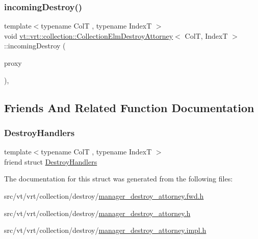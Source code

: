 \subsubsection{\texorpdfstring{incoming\+Destroy()}{incomingDestroy()}}
{\footnotesize\ttfamily template$<$typename ColT , typename IndexT $>$ \\
void \hyperlink{structvt_1_1vrt_1_1collection_1_1_collection_elm_destroy_attorney}{vt\+::vrt\+::collection\+::\+Collection\+Elm\+Destroy\+Attorney}$<$ ColT, IndexT $>$\+::incoming\+Destroy (\begin{DoxyParamCaption}\item[{\hyperlink{namespacevt_a2be17f5dafb626fe9f58d762b6aad2f0}{Collection\+Index\+Proxy}$<$ ColT, IndexT $>$ const \&}]{proxy }\end{DoxyParamCaption})\hspace{0.3cm}{\ttfamily [static]}, {\ttfamily [private]}}



\subsection{Friends And Related Function Documentation}
\mbox{\label{structvt_1_1vrt_1_1collection_1_1_collection_elm_destroy_attorney_ab072692eaf0bed072206c6c8119b79ea}} 
\subsubsection{\texorpdfstring{Destroy\+Handlers}{DestroyHandlers}}
{\footnotesize\ttfamily template$<$typename ColT , typename IndexT $>$ \\
friend struct \hyperlink{structvt_1_1vrt_1_1collection_1_1_destroy_handlers}{Destroy\+Handlers}\hspace{0.3cm}{\ttfamily [friend]}}



The documentation for this struct was generated from the following files\+:\begin{DoxyCompactItemize}
\item 
src/vt/vrt/collection/destroy/\hyperlink{manager__destroy__attorney_8fwd_8h}{manager\+\_\+destroy\+\_\+attorney.\+fwd.\+h}\item 
src/vt/vrt/collection/destroy/\hyperlink{manager__destroy__attorney_8h}{manager\+\_\+destroy\+\_\+attorney.\+h}\item 
src/vt/vrt/collection/destroy/\hyperlink{manager__destroy__attorney_8impl_8h}{manager\+\_\+destroy\+\_\+attorney.\+impl.\+h}\end{DoxyCompactItemize}

